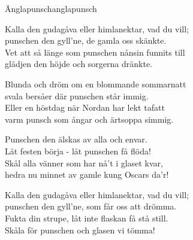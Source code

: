 \begin{song}{Änglapunsch}{anglapunsch}
\begin{vers}
Kalla den gudagåva eller himlanektar, vad du vill;\\
punschen den gyll'ne, de gamla oss skänkte.\\
Vet att så länge som punschen nånsin funnits till\\
glädjen den höjde och sorgerna dränkte.\\
\end{vers}
\begin{vers}
Blunda och dröm om en blommande sommarnatt\\
svala bersåer där punschen står immig.\\
Eller en höstdag när Nordan har lekt tafatt\\
varm punsch som ångar och ärtsoppa simmig.\\
\end{vers}
\begin{vers}
Punschen den älskas av alla och envar.\\
Låt festen börja - låt punschen få flöda!\\
Skål alla vänner som har nå't i glaset kvar,\\
hedra nu minnet av gamle kung Oscars da'r!\\
\end{vers}
\begin{vers}
Kalla den gudagåva eller himlanektar, vad du vill;\\
punschen den gyll'ne, som får oss att drömma.\\
Fukta din strupe, låt inte flaskan få stå still.\\
Skåla för punschen och glasen vi tömma!\\
\end{vers}
\end{song}
